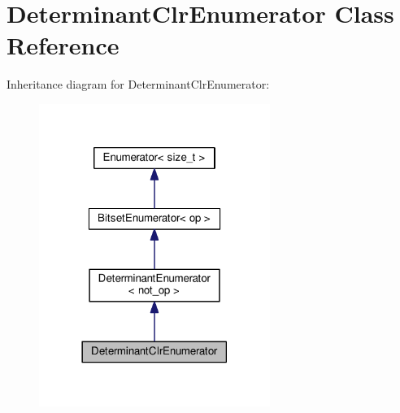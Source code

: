 \hypertarget{classDeterminantClrEnumerator}{}\section{Determinant\+Clr\+Enumerator Class Reference}
\label{classDeterminantClrEnumerator}


Inheritance diagram for Determinant\+Clr\+Enumerator\+:\nopagebreak
\begin{figure}[H]
\begin{center}
\leavevmode
\includegraphics[width=213pt]{classDeterminantClrEnumerator__inherit__graph}
\end{center}
\end{figure}



